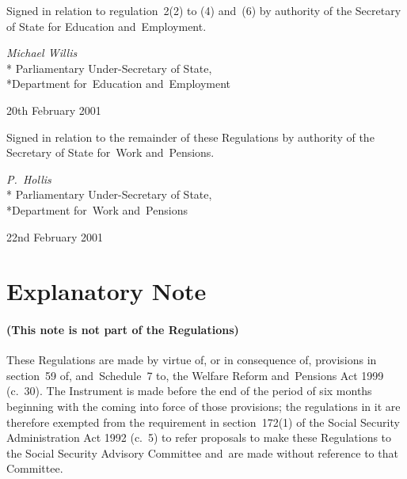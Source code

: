\documentclass[12pt,a4paper]{article}
\begin{document}
\bigskip

Signed in relation to regulation~2(2) to (4) and~(6) by authority of the Secretary of State for Education and~Employment. 

{\raggedleft
\emph{Michael Willis}\\*
Parliamentary Under-Secretary 
of State,\\*Department 
for~Education and~Employment

}

20th February 2001

\bigskip

Signed 
in relation to the remainder of these Regulations 
by authority of the 
Secretary of State for~Work and~Pensions.

{\raggedleft
\emph{P.~Hollis}\\*
Parliamentary Under-Secretary 
of State,\\*Department 
for~Work and~Pensions

}

22nd February 2001

\small

\part{Explanatory Note}

\renewcommand\parthead{— Explanatory Note}

\subsection*{(This note is not part of the Regulations)}

These Regulations are made by virtue of, or in consequence of, provisions in section~59 of, and~Schedule~7 to, the Welfare Reform and~Pensions Act 1999 (c.~30). The Instrument is made before the end of the period of six months beginning with the coming into force of those provisions; the regulations in it are therefore exempted from the requirement in section~172(1) of the Social Security Administration Act 1992 (c.~5) to refer proposals to make these Regulations to the Social Security Advisory Committee and~are made without reference to that Committee.
\end{document}
